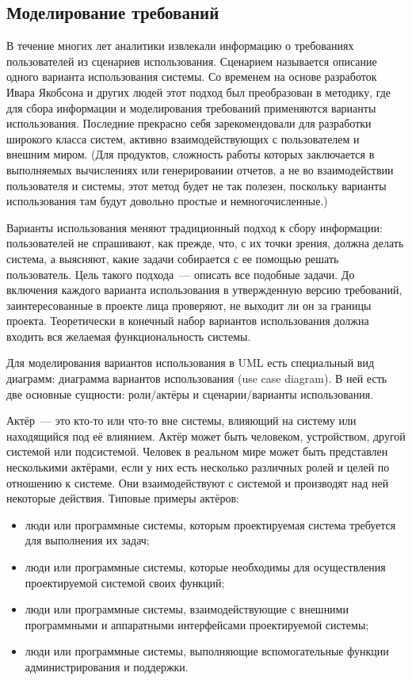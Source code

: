 \documentclass{../../text-style}
\begin{document}
\subsection{Моделирование требований}

В течение многих лет аналитики извлекали информацию о требованиях пользователей из сценариев использования. Сценарием называется описание одного варианта использования системы. Со временем на основе разработок Ивара Якобсона и других людей этот подход был преобразован в методику, где для сбора информации и моделирования требований применяются варианты использования. Последние прекрасно себя зарекомендовали для разработки широкого класса систем, активно взаимодействующих с пользователем и внешним миром. (Для продуктов, сложность работы которых заключается в выполняемых вычислениях или генерировании отчетов, а не во взаимодействии пользователя и системы, этот метод будет не так полезен, поскольку варианты использования там будут довольно простые и немногочисленные.)

Варианты использования меняют традиционный подход к сбору информации: пользователей не спрашивают, как прежде, что, с их точки зрения, должна делать система, а выясняют, какие задачи собирается с ее помощью решать пользователь. Цель такого подхода~--- описать все подобные задачи. До включения каждого варианта использования в утвержденную версию требований, заинтересованные в проекте лица проверяют, не выходит ли он за границы проекта. Теоретически в конечный набор вариантов использования должна входить вся желаемая функциональность системы.

Для моделирования вариантов использования в UML есть специальный вид диаграмм: диаграмма вариантов использования (use case diagram). В ней есть две основные сущности: роли/актёры и сценарии/варианты использования.

Актёр~--- это кто-то или что-то вне системы, влияющий на систему или находящийся под её влиянием. Актёр может быть человеком, устройством, другой системой или подсистемой. Человек в реальном мире может быть представлен несколькими актёрами, если у них есть несколько различных ролей и целей по отношению к системе. Они взаимодействуют с системой и производят над ней некоторые действия. Типовые примеры актёров:

\begin{itemize}
    \item люди или программные системы, которым проектируемая система требуется для выполнения их задач;
    \item люди или программные системы, которые необходимы для осуществления проектируемой системой своих функций;
    \item люди или программные системы, взаимодействующие с внешними программными и аппаратными интерфейсами проектируемой системы;
    \item люди или программные системы, выполняющие вспомогательные функции администрирования и поддержки.
\end{itemize}
\end{document}
